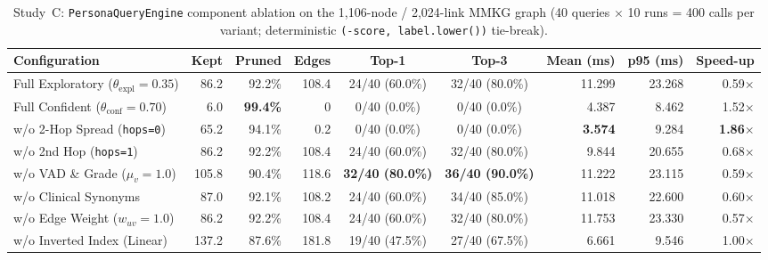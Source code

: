\documentclass[12pt,a4paper,oneside]{report}
\newcommand{\code}[1]{\texttt{\small #1}}
\begin{document}
\begin{table}[H]
\centering
\caption{Study~C: \code{PersonaQueryEngine} component ablation on the 1{,}106-node / 2{,}024-link MMKG graph (40 queries $\times$ 10 runs = 400 calls per variant; deterministic \code{(-score, label.lower())} tie-break).}
\label{tab:mmkg-persona-ablation}
\scriptsize
\setlength{\tabcolsep}{2.0pt}
\begin{tabular}{@{}l rrr cc rrr@{}}
\toprule
Configuration & Kept & Pruned & Edges & Top-1 & Top-3 & Mean (ms) & p95 (ms) & Speed-up\\
\midrule
Full Exploratory ($\theta_{\text{expl}}=0.35$) & 86.2 & 92.2\% & 108.4 & 24/40 (60.0\%) & 32/40 (80.0\%) & 11.299 & 23.268 & 0.59$\times$\\
Full Confident ($\theta_{\text{conf}}=0.70$) & 6.0 & \textbf{99.4\%} & 0 & 0/40 (0.0\%) & 0/40 (0.0\%) & 4.387 & 8.462 & 1.52$\times$\\
w/o 2-Hop Spread (\code{hops=0}) & 65.2 & 94.1\% & 0.2 & 0/40 (0.0\%) & 0/40 (0.0\%) & \textbf{3.574} & 9.284 & \textbf{1.86$\times$}\\
w/o 2nd Hop (\code{hops=1}) & 86.2 & 92.2\% & 108.4 & 24/40 (60.0\%) & 32/40 (80.0\%) & 9.844 & 20.655 & 0.68$\times$\\
w/o VAD \& Grade ($\mu_v=1.0$) & 105.8 & 90.4\% & 118.6 & \textbf{32/40 (80.0\%)} & \textbf{36/40 (90.0\%)} & 11.222 & 23.115 & 0.59$\times$\\
w/o Clinical Synonyms & 87.0 & 92.1\% & 108.2 & 24/40 (60.0\%) & 34/40 (85.0\%) & 11.018 & 22.600 & 0.60$\times$\\
w/o Edge Weight ($w_{uv}=1.0$) & 86.2 & 92.2\% & 108.4 & 24/40 (60.0\%) & 32/40 (80.0\%) & 11.753 & 23.330 & 0.57$\times$\\
w/o Inverted Index (Linear) & 137.2 & 87.6\% & 181.8 & 19/40 (47.5\%) & 27/40 (67.5\%) & 6.661 & 9.546 & 1.00$\times$\\
\bottomrule
\end{tabular}
\end{table}
\end{document}
